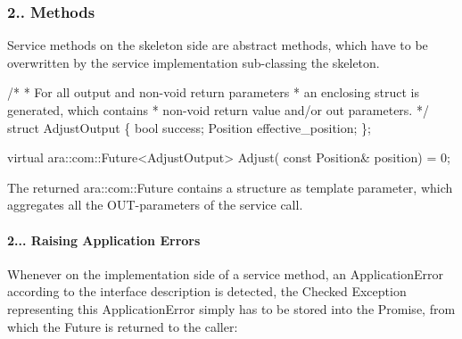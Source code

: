\subsubsection*{2.. Methods}


\begin{DoxyItemize}
\item Service methods on the skeleton side are abstract methods, which have to be overwritten by the service implementation sub-\/classing the skeleton.
\end{DoxyItemize}


\begin{DoxyCode}
\textcolor{comment}{/*}
\textcolor{comment}{* For all output and non-void return parameters}
\textcolor{comment}{* an enclosing struct is generated, which contains}
\textcolor{comment}{* non-void return value and/or out parameters.}
\textcolor{comment}{*/}
\textcolor{keyword}{struct }AdjustOutput \{
\textcolor{keywordtype}{bool} success;
Position effective\_position;
\};

\textcolor{keyword}{virtual} ara::com::Future<AdjustOutput> Adjust(
\textcolor{keyword}{const} Position& position) = 0;
\end{DoxyCode}

\begin{DoxyItemize}
\item The returned ara\+::com\+::\+Future contains a structure as template parameter, which aggregates all the O\+U\+T-\/parameters of the service call.
\end{DoxyItemize}

\paragraph*{2... Raising Application Errors}


\begin{DoxyItemize}
\item Whenever on the implementation side of a service method, an Application\+Error according to the interface description is detected, the Checked Exception representing this Application\+Error simply has to be stored into the Promise, from which the Future is returned to the caller\+:
\end{DoxyItemize}


